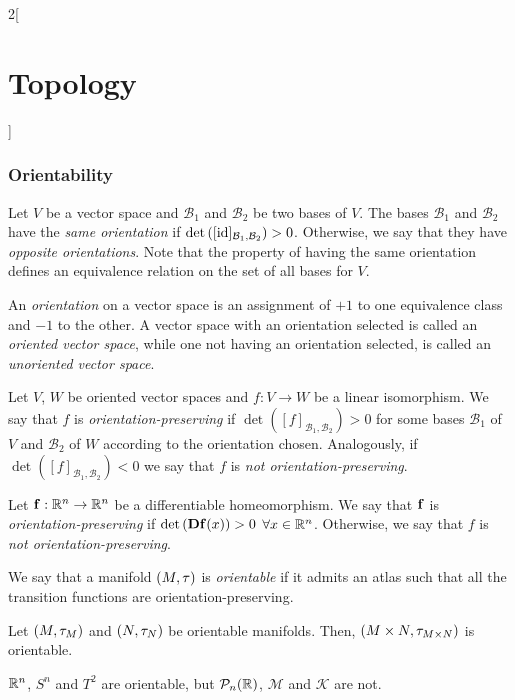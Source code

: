 \documentclass[../../../main.tex]{subfiles}
\begin{document}
\begin{multicols}{2}[\section{Topology}]
  \subsubsection{Orientability}
  \begin{definition}
    Let $V$ be a vector space and $\mathcal{B}_1$ and $\mathcal{B}_2$ be two bases of $V$. The bases $\mathcal{B}_1$ and $\mathcal{B}_2$ have the \emph{same orientation} if $\det\left([\mathrm{id}]_{\mathcal{B}_1,\mathcal{B}_2}\right)>0$. Otherwise, we say that they have \emph{opposite orientations}. Note that the property of having the same orientation defines an equivalence relation on the set of all bases for $V$.
  \end{definition}
  \begin{definition}
    An \emph{orientation} on a vector space is an assignment of $+1$ to one equivalence class and $-1$ to the other. A vector space with an orientation selected is called an \emph{oriented vector space}, while one not having an orientation selected, is called an \emph{unoriented vector space}.
  \end{definition}
  \begin{definition}
    Let $V$, $W$ be oriented vector spaces and $f:V\rightarrow W$ be a linear isomorphism. We say that $f$ is \emph{orientation-preserving} if $\det \left([f]_{\mathcal{B}_1,\mathcal{B}_2}\right)>0$ for some bases $\mathcal{B}_1$ of $V$ and $\mathcal{B}_2$ of $W$ according to the orientation chosen. Analogously, if $\det \left([f]_{\mathcal{B}_1,\mathcal{B}_2}\right)<0$ we say that $f$ is \emph{not orientation-preserving}.
  \end{definition}
  \begin{definition}
    Let $\boldsymbol{\mathrm{f}}:\mathbb{R}^n\rightarrow\mathbb{R}^n$ be a differentiable homeomorphism. We say that $\boldsymbol{\mathrm{f}}$ is \emph{orientation-preserving} if $\det \left(\boldsymbol{\mathrm{Df}}(x)\right)>0$ $\forall x\in\mathbb{R}^n$. Otherwise, we say that $f$ is \emph{not orientation-preserving}.
  \end{definition}
  \begin{definition}
    We say that a manifold $(M,\tau)$ is \emph{orientable} if it admits an atlas such that all the transition functions are orientation-preserving.
  \end{definition}
  \begin{proposition}
    Let $(M,\tau_M)$ and $(N,\tau_N)$ be orientable manifolds. Then, $(M\times N,\tau_{M\times N})$ is orientable.
  \end{proposition}
  \begin{proposition}
    $\mathbb{R}^n$, $S^n$ and $T^2$ are orientable, but $\mathcal{P}_n(\mathbb{R})$, $\mathcal{M}$ and $\mathcal{K}$ are not.
  \end{proposition}

\end{multicols}
\end{document}
